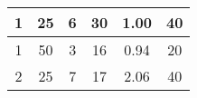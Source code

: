 \begin{tabular}{|*{6}{c|}}
\hline 
1 & 25 & 6 & 30 & 1.00 & 40 \\ \hline 
 1 & 50 & 3 & 16 & 0.94 & 20 \\ \hline 
 2 & 25 & 7 & 17 & 2.06 & 40 \\ \hline 
 \end{tabular} 
